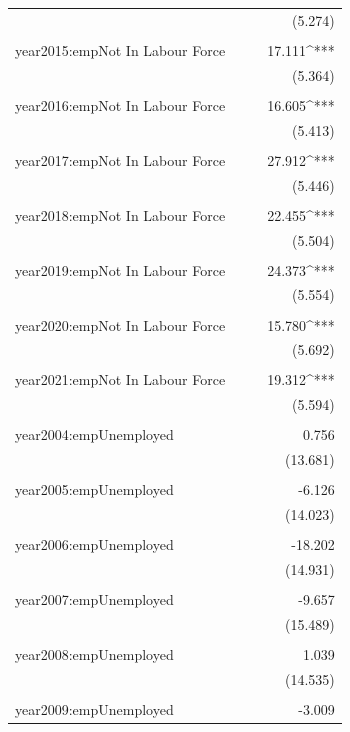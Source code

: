 \documentclass[
]{article}
\begin{document}
\begin{table}[!htbp]
\begin{tabular}{@{\extracolsep{5pt}}lD{.}{.}{-3} D{.}{.}{-3} D{.}{.}{-3} }
  &  &  & (5.274) \\ 
  & & & \\ 
 year2015:empNot In Labour Force &  &  & 17.111^{***} \\ 
  &  &  & (5.364) \\ 
  & & & \\ 
 year2016:empNot In Labour Force &  &  & 16.605^{***} \\ 
  &  &  & (5.413) \\ 
  & & & \\ 
 year2017:empNot In Labour Force &  &  & 27.912^{***} \\ 
  &  &  & (5.446) \\ 
  & & & \\ 
 year2018:empNot In Labour Force &  &  & 22.455^{***} \\ 
  &  &  & (5.504) \\ 
  & & & \\ 
 year2019:empNot In Labour Force &  &  & 24.373^{***} \\ 
  &  &  & (5.554) \\ 
  & & & \\ 
 year2020:empNot In Labour Force &  &  & 15.780^{***} \\ 
  &  &  & (5.692) \\ 
  & & & \\ 
 year2021:empNot In Labour Force &  &  & 19.312^{***} \\ 
  &  &  & (5.594) \\ 
  & & & \\ 
 year2004:empUnemployed &  &  & 0.756 \\ 
  &  &  & (13.681) \\ 
  & & & \\ 
 year2005:empUnemployed &  &  & -6.126 \\ 
  &  &  & (14.023) \\ 
  & & & \\ 
 year2006:empUnemployed &  &  & -18.202 \\ 
  &  &  & (14.931) \\ 
  & & & \\ 
 year2007:empUnemployed &  &  & -9.657 \\ 
  &  &  & (15.489) \\ 
  & & & \\ 
 year2008:empUnemployed &  &  & 1.039 \\ 
  &  &  & (14.535) \\ 
  & & & \\ 
 year2009:empUnemployed &  &  & -3.009 \\ 

\end{tabular}
\end{table}
\end{document}
